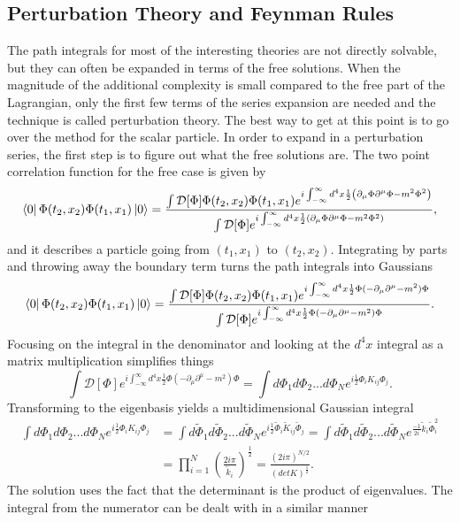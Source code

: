 \subsection{Perturbation Theory and Feynman Rules}
The path integrals for most of the interesting theories are not directly solvable, but they can often be expanded in terms of the free solutions. When the magnitude of the additional complexity is small compared to the free part of the Lagrangian, only the first few terms of the series expansion are needed and the technique is called perturbation theory. The best way to get at this point is to go over the method for the scalar particle. In order to expand in a perturbation series, the first step is to figure out what the free solutions are. The two point correlation function for the free case is given by
\begin{equation}
\bra{0}\Phi(t_2,x_2)\Phi(t_1,x_1)\ket{0} = 
\frac{\int \mathcal{D}[\Phi]\Phi(t_2,x_2)\Phi(t_1,x_1)e^{i\int_{-\infty}^{\infty} d^4x \frac{1}{2}\left(\partial_\mu\Phi\partial^\mu\Phi - m^2 \Phi^2 \right)}}
{\int \mathcal{D}[\Phi]e^{i\int_{-\infty}^{\infty} d^4x \frac{1}{2}\left(\partial_\mu\Phi\partial^\mu\Phi - m^2 \Phi^2 \right)}},
\end{equation}
and it describes a particle going from $(t_1,x_1)$ to $(t_2,x_2)$. Integrating by parts and throwing away the boundary term turns the path integrals into Gaussians 
\begin{equation}
\bra{0}\Phi(t_2,x_2)\Phi(t_1,x_1)\ket{0} = 
\frac{\int \mathcal{D}[\Phi]\Phi(t_2,x_2)\Phi(t_1,x_1)e^{i\int_{-\infty}^{\infty} d^4x \frac{1}{2}\Phi (-\partial_\mu\partial^\mu - m^2)\Phi}}
{\int \mathcal{D}[\Phi]e^{i\int_{-\infty}^{\infty} d^4x \frac{1}{2}\Phi (-\partial_\mu\partial^\mu - m^2)\Phi}}.
\end{equation}
Focusing on the integral in the denominator and looking at the $d^4x$ integral as a matrix multiplication simplifies things 
\begin{equation}
\int \mathcal{D}[\Phi]e^{i\int_{-\infty}^{\infty} d^4x \frac{1}{2}\Phi (-\partial_\mu\partial^\mu - m^2)\Phi}
= \int d\Phi_1 d\Phi_2 ... d\Phi_N e^{i\frac{1}{2}\Phi_{i} K_{ij} \Phi_{j}}.
\end{equation}
Transforming to the eigenbasis yields a multidimensional Gaussian integral
\begin{equation}
\begin{split}
 \int d\Phi_1 d\Phi_2 ... d\Phi_N e^{i\frac{1}{2}\Phi_{i} K_{ij} \Phi_{j}} 
 &= \int d\tilde{\Phi}_1 d\tilde{\Phi}_2 ... d\tilde{\Phi}_N e^{i\frac{1}{2}\tilde{\Phi}_{i} \tilde{K}_{ij} \tilde{\Phi}_{j}} 
 = \int d\tilde{\Phi}_1 d\tilde{\Phi}_2 ... d\tilde{\Phi}_N e^{\frac{-1}{2i} \tilde{k}_i \tilde{\Phi}_{i}^2} \\ 
& = \prod_{i=1}^N \left( \frac{2i\pi}{\tilde{k}_i} \right)^\frac{1}{2} = \frac{\left( 2i\pi \right)^{N/2}}{ \left( detK \right)^\frac{1}{2}}.
\end{split}
\end{equation}
The solution uses the fact that the determinant is the product of eigenvalues. The integral from the numerator can be dealt with in a similar manner 

